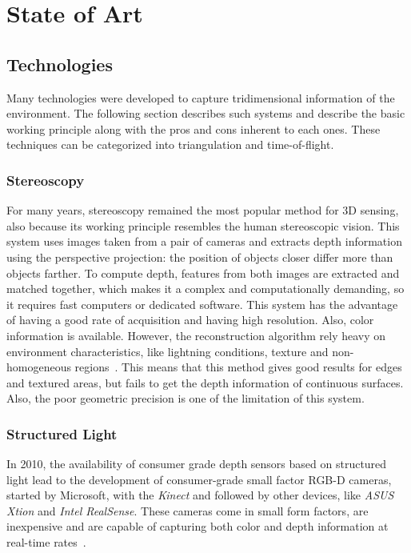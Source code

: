 \chapter{State of Art}

\section{Technologies}

Many technologies were developed to capture tridimensional information of the environment. The following section describes such systems and describe the basic working principle along with the pros and cons inherent to each ones. These techniques can be categorized into triangulation and time-of-flight.

\subsection{Stereoscopy}

For many years, stereoscopy remained the most popular method for 3D sensing, also because its working principle resembles the human stereoscopic vision. This system uses images taken from a pair of cameras and extracts depth information using the perspective projection: the position of objects closer differ more than objects farther. To compute depth, features from both images are extracted and matched together, which makes it a complex and computationally demanding, so it requires fast computers or dedicated software. This system has the advantage of having a good rate of acquisition and having high resolution. Also, color information is available. However, the reconstruction algorithm rely heavy on environment characteristics, like lightning conditions, texture and non-homogeneous regions~\cite{klimentjew2010}. This means that this method gives good results for edges and textured areas, but fails to get the depth information of continuous surfaces. Also, the poor geometric precision is one of the limitation of this system.

\subsection{Structured Light}

In 2010, the availability of consumer grade depth sensors based on structured light lead to the development of consumer-grade small factor RGB-D cameras, started by Microsoft, with the \textit{Kinect} and followed by other devices, like \textit{ASUS Xtion} and \textit{Intel RealSense}. These cameras come in small form factors, are inexpensive and are capable of capturing both color and depth information at real-time rates~\cite{zollhoefer2018}.

